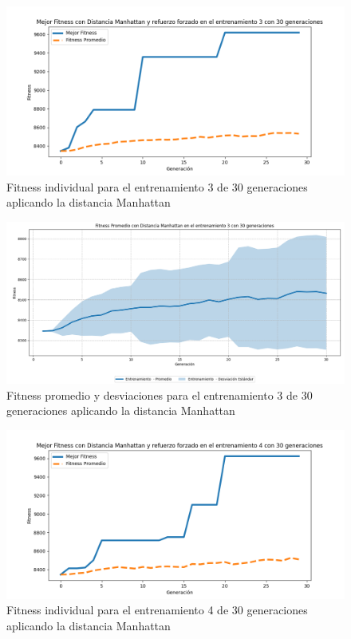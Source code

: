 \documentclass[conference]{IEEEtran}
\begin{document}
\begin{figure}[H]
    \centering
    \includegraphics[width=0.9 \linewidth]{Manhattan/Fitness_individual_30Gen/Fitness_3_Mahn_30Gen.png}
    \caption{Fitness individual para el entrenamiento 3 de 30 generaciones aplicando la distancia Manhattan}
    \label{fig:manhattan_3_30}
\end{figure}
\begin{figure}[H]
    \centering
    \includegraphics[width=0.9 \linewidth]{Manhattan/Fitness_individual_30Gen/Fitness_3_Mahn_30Gen_Sombra.png}
    \caption{Fitness promedio y desviaciones para el entrenamiento 3 de 30 generaciones aplicando la distancia Manhattan}
    \label{fig:manhattan_3_30_sombra}
\end{figure}

\begin{figure}[H]
    \centering
    \includegraphics[width=0.9 \linewidth]{Manhattan/Fitness_individual_30Gen/Fitness_4_Mahn_30Gen.png}
    \caption{Fitness individual para el entrenamiento 4 de 30 generaciones aplicando la distancia Manhattan}
    \label{fig:manhattan_4_30}
\end{figure}
\end{document}
